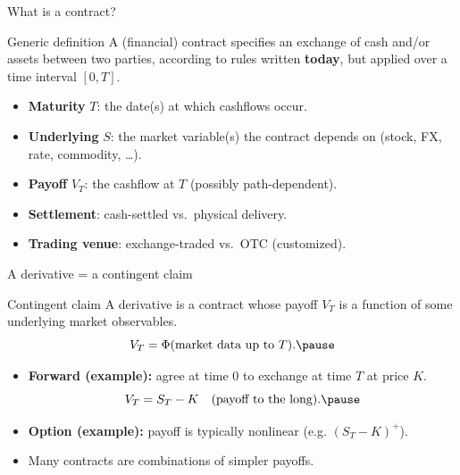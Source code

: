\documentclass[10pt,aspectratio=169]{beamer}
\begin{document}
\begin{frame}{What is a contract?}
\begin{block}{Generic definition}
A (financial) contract specifies an exchange of cash and/or assets between two parties,
according to rules written \textbf{today}, but applied over a time interval $[0,T]$.\pause
\end{block}

\medskip
\begin{itemize}
  \item \textbf{Maturity} $T$: the date(s) at which cashflows occur.\pause
  \item \textbf{Underlying} $S$: the market variable(s) the contract depends on (stock, FX, rate, commodity, \dots).\pause
  \item \textbf{Payoff} $V_T$: the cashflow at $T$ (possibly path-dependent).\pause
  \item \textbf{Settlement}: cash-settled vs.\ physical delivery.\pause
  \item \textbf{Trading venue}: exchange-traded vs.\ OTC (customized).
\end{itemize}
\end{frame}

\begin{frame}{A derivative = a contingent claim}
\begin{block}{Contingent claim}
A derivative is a contract whose payoff $V_T$ is a function of some underlying market observables. \pause 
\[
V_T = \Phi(\text{market data up to }T). \pause 
\]
\end{block}

\medskip
\begin{itemize}
  \item \textbf{Forward (example):} agree at time $0$ to exchange at time $T$ at price $K$.
  \[
  V_T = S_T - K \quad \text{(payoff to the long).} \pause 
  \]
  \item \textbf{Option (example):} payoff is typically nonlinear (e.g. $(S_T-K)^+$). \pause 
  \item Many contracts are combinations of simpler payoffs.
\end{itemize}
\end{frame}
\end{document}
